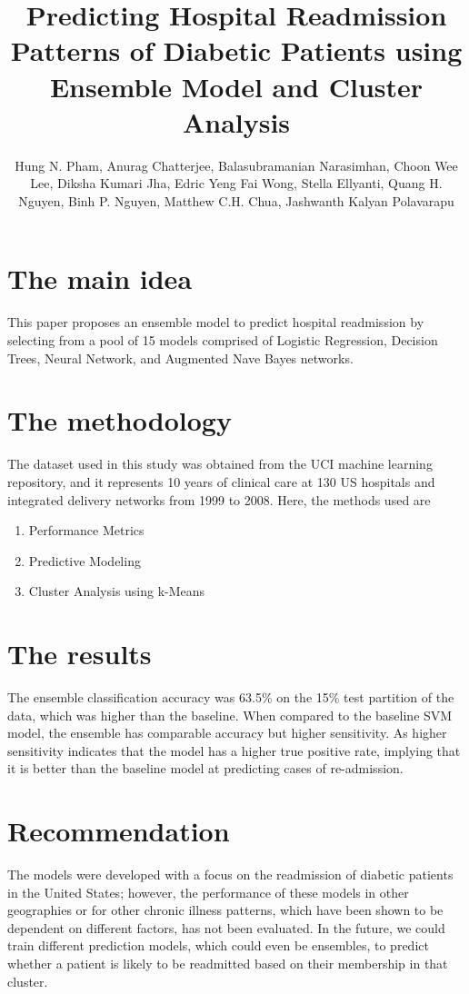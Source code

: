 \documentclass[a4paper]{article}
\title{Predicting Hospital Readmission Patterns of Diabetic Patients using Ensemble Model and Cluster Analysis}
\author[1]{Hung N. Pham, Anurag Chatterjee, Balasubramanian Narasimhan, Choon Wee Lee, Diksha Kumari Jha, Edric Yeng Fai Wong, Stella Ellyanti, Quang H. Nguyen, Binh P. Nguyen, Matthew C.H. Chua, Jashwanth Kalyan Polavarapu}
\begin{document}
\maketitle
\section{The main idea}

This paper proposes an ensemble model to predict hospital readmission by selecting from a pool of 15 models comprised of Logistic Regression, Decision Trees, Neural Network, and Augmented Nave Bayes networks. 

\section{The methodology }

The dataset used in this study was obtained from the UCI machine learning repository, and it represents 10 years of clinical care at 130 US hospitals and integrated delivery networks from 1999 to 2008.
Here, the methods used are 
\begin{enumerate}
\item Performance Metrics
\item Predictive Modeling
\item Cluster Analysis using k-Means
\end{enumerate}



\section{The results}
 
The ensemble classification accuracy was 63.5\% on the 15\% test partition of the data, which was higher than the baseline. When compared to the baseline SVM model, the ensemble has comparable accuracy but higher sensitivity.  As higher sensitivity indicates that the model has a higher true positive rate, implying that it is better than the baseline model at predicting cases of re-admission.

\section{Recommendation}

The models were developed with a focus on the readmission of diabetic patients in the United States; however, the performance of these models in other geographies or for other chronic illness patterns, which have been shown to be dependent on different factors, has not been evaluated. In the future, we could train different prediction models, which could even be ensembles, to predict whether a patient is likely to be readmitted based on their membership in that cluster. 
\end{document}
